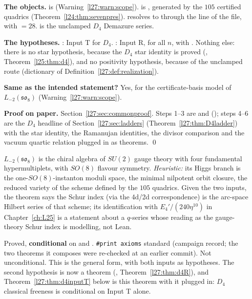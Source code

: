\begin{dictionary}
\textbf{The objects.}  is  (Warning~\ref{l27:warn:scope}).
 is , generated by the $105$ certified quadrics
(Theorem~\ref{l24:thm:sevenpres}).  resolves to  through the  line of the
file, with  $=28$.  is the unclamped $D_4$ Demazure series.

\textbf{The hypotheses.} : Input T for $D_4$. : Input R, for all $n$, with . Nothing
else: there is no star hypothesis, because the $D_4$ star identity is proved (, Theorem~\ref{l25:thm:d4}), and
no positivity hypothesis, because of the unclamped route (dictionary of Definition~\ref{l27:def:realization}).

\textbf{Same as the intended statement?} Yes, for the certificate-basis model of $L_{-2}(\mathfrak{so}_8)$ (Warning~\ref{l27:warn:scope}).
\end{dictionary}

\textbf{Proof on paper.} Section~\ref{l27:sec:commonproof}. Steps 1--3 are  and
 (); steps 4--6 are the $D_4$ headline
of Section~\ref{l27:sec:ladders} (Theorem~\ref{l27:thm:D4ladder}) with the star identity, the Ramanujan identities, the divisor
comparison and the vacuum quartic relation plugged in as theorems. \qed

\begin{physics}
$L_{-2}(\mathfrak{so}_8)$ is the chiral algebra of $SU(2)$ gauge theory with four fundamental hypermultiplets, with $SO(8)$ flavour
symmetry. \emph{Heuristic:} its Higgs branch is the one-$SO(8)$-instanton moduli space, the minimal nilpotent orbit closure, the reduced
variety of the scheme defined by the $105$ quadrics. Given the two inputs, the theorem says the Schur index (via the 4d/2d
correspondence) is the arc-space Hilbert series of that scheme; its identification with $E_4'/(240\eta^{10})$ in Chapter~\ref{ch:L25}
is a statement about a $q$-series whose reading as the gauge-theory Schur index is modelling, not Lean.
\end{physics}

\begin{status}
Proved, \textbf{conditional} on  and . \texttt{\#print axioms}
standard (campaign record; the two theorems it composes were re-checked at an earlier commit). Not unconditional. This is the
general form, with both inputs as hypotheses. The second hypothesis is now a theorem
(, Theorem~\ref{l27:thm:d4R}), and Theorem~\ref{l27:thm:d4inputT} below is this theorem with it
plugged in: $D_4$ classical freeness is conditional on Input T alone.
\end{status}

